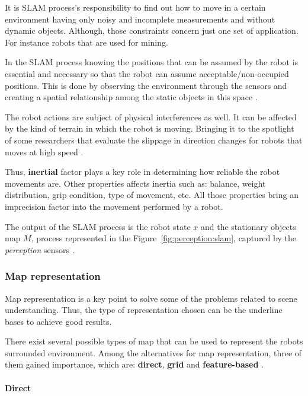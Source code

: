 It is SLAM process's responsibility to find out how to move in a certain environment having only noisy and incomplete measurements and without dynamic objects. Although, those constraints concern just one set of application. For instance robots that are used for mining.

In the SLAM process knowing the positions that can be assumed by the robot is essential and necessary so that the robot can assume acceptable/non-occupied positions. This is done by observing the environment through the sensors and creating a spatial relationship among the static objects in this space \cite{iyengar1991autonomous}.

The robot actions are subject of physical interferences as well. It can be affected by the kind of terrain in which the robot is moving. Bringing it to the spotlight of some researchers that evaluate the slippage in direction changes for robots that moves at high speed \cite{DBLP:conf/icra/LenainTHM11}. 

Thus, \textbf{inertial} factor plays a key role in determining how reliable the robot movements are. Other properties affects inertia such as: balance, weight distribution, grip condition, type of movement, etc. All those properties bring an imprecision factor into the movement performed by a robot. 

The output of the SLAM process is the robot state $x$ and the stationary objects map $M$, process represented in the Figure~\ref{fig:perception:slam}, captured by the \textit{perception} sensors \cite{iyengar1991autonomous}.

\subsubsection{Map representation}

Map representation is a key point to solve some of the problems related to scene understanding. Thus, the type of representation chosen can be the underline bases to achieve good results.

There exist several possible types of map that can be used to represent the robots surrounded environment. Among the alternatives for map representation, three of them gained importance, which are: \textbf{direct}, \textbf{grid} and \textbf{feature-based} \cite{Wang04a}.

\paragraph{Direct}

